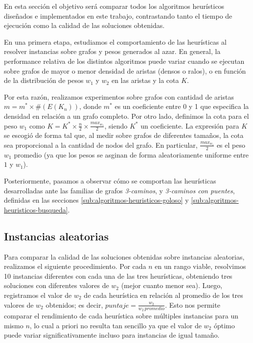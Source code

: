 En esta sección el objetivo será comparar todos los algoritmos heurísticos diseñados e implementados en este trabajo, contrastando tanto el tiempo de ejecución como la calidad de las soluciones obtenidas.


En una primera etapa, estudiamos el comportamiento de las heurísticas al resolver instancias sobre grafos y pesos generados al azar. En general, la performance relativa de los distintos algoritmos puede variar cuando se ejecutan sobre grafos de mayor o menor densidad de aristas (densos o ralos), o en función de la distribución de pesos $w_1$ y $w_2$ en las aristas y la cota $K$.

Por esta razón, realizamos experimentos sobre grafos con cantidad de aristas $m = m^* \times \#(E(K_n))$, donde $m^*$ es un coeficiente entre 0 y 1 que especifica la densidad en relación a un grafo completo. Por otro lado, definimos la cota para el peso $w_1$ como $K = K^* \times \frac{n}{2} \times \frac{max_{w_1}}{2}$, siendo $K^*$ un coeficiente. La expresión para $K$ se escogió de forma tal que, al medir sobre grafos de diferentes tamaños, la cota sea proporcional a la cantidad de nodos del grafo. En particular, $\frac{max_{w_1}}{2}$ es el peso $w_1$ promedio (ya que los pesos se asginan de forma aleatoriamente uniforme entre $1$ y $w_1$).

Posteriormente, pasamos a observar cómo se comportan las heurísticas desarrolladas ante las familias de grafos \emph{3-caminos}, y \emph{3-caminos con puentes}, definidas en las secciones \ref{sub:algoritmos-heuristicos-goloso} y \ref{sub:algoritmos-heuristicos-busqueda}.

\subsection{Instancias aleatorias}

Para comparar la calidad de las soluciones obtenidas sobre instancias aleatorias, realizamos el siguiente procedimiento.
Por cada $n$ en un rango viable, resolvimos 10 instancias diferentes con cada una de las tres heurísticas, obteniendo tres soluciones con diferentes valores de $w_2$ (mejor cuanto menor sea). Luego, registramos el valor de $w_2$ de cada heurística en relación al promedio de los tres valores de $w_2$ obtenidos; es decir, $puntaje = \frac{w_2}{w_2 \, promedio}$. Esto nos permite comparar el rendimiento de cada heurística sobre múltiples instancias para un mismo $n$, lo cual a priori no resulta tan sencillo ya que el valor de $w_2$ óptimo puede variar significativamente incluso para instancias de igual tamaño.

